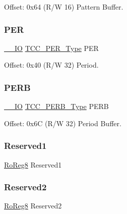 Offset\+: 0x64 (R/W 16) Pattern Buffer. 

\mbox{\label{struct_tcc_a2a7c4d62153e1e55dcb754b1c9145729}} 
\subsubsection{\texorpdfstring{PER}{PER}}
{\footnotesize\ttfamily \mbox{\hyperlink{core__cm0plus_8h_aec43007d9998a0a0e01faede4133d6be}{\+\_\+\+\_\+\+IO}} \mbox{\hyperlink{union_t_c_c___p_e_r___type}{T\+C\+C\+\_\+\+P\+E\+R\+\_\+\+Type}} P\+ER}



Offset\+: 0x40 (R/W 32) Period. 

\mbox{\label{struct_tcc_a7a37803958084cd2f8c4b5ca00739173}} 
\subsubsection{\texorpdfstring{PERB}{PERB}}
{\footnotesize\ttfamily \mbox{\hyperlink{core__cm0plus_8h_aec43007d9998a0a0e01faede4133d6be}{\+\_\+\+\_\+\+IO}} \mbox{\hyperlink{union_t_c_c___p_e_r_b___type}{T\+C\+C\+\_\+\+P\+E\+R\+B\+\_\+\+Type}} P\+E\+RB}



Offset\+: 0x6C (R/W 32) Period Buffer. 

\mbox{\label{struct_tcc_a4e5d6a915ea4537cf07dee3bb8de31b3}} 
\subsubsection{\texorpdfstring{Reserved1}{Reserved1}}
{\footnotesize\ttfamily \mbox{\hyperlink{group___s_a_m_d21_e15_a__definitions_ga0d957f1433aaf5d70e4dc2b68288442d}{Ro\+Reg8}} Reserved1}

\mbox{\label{struct_tcc_a2e22156efdbee765577c760f170204da}} 
\subsubsection{\texorpdfstring{Reserved2}{Reserved2}}
{\footnotesize\ttfamily \mbox{\hyperlink{group___s_a_m_d21_e15_a__definitions_ga0d957f1433aaf5d70e4dc2b68288442d}{Ro\+Reg8}} Reserved2}

